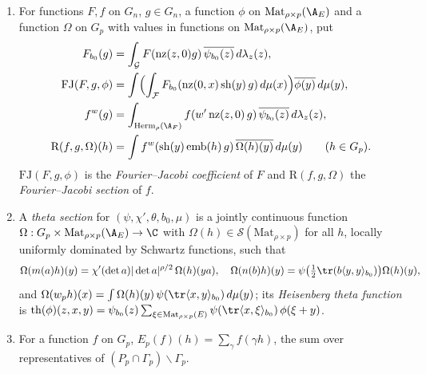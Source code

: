 \begin{definition}
\begin{enumerate}[label=(\alph*)]
$\mathrm{Herm}_\rho(E)$ and a measure $\mu$ of covolume one on $\mathrm{Mat}_{\rho\times p}(\A_E)$ with a fundamental domain $\mathcal F$.
\item For functions $F,f$ on $G_n$, $g\in G_n$, a function $\phi$ on $\mathrm{Mat}_{\rho\times p}(\A_E)$ and a function $\Omega$ on $G_p$ with values in
functions on $\mathrm{Mat}_{\rho\times p}(\A_E)$, put
\begin{align*}
F_{b_0}(g)&=\int_{\mathcal G}F(\mathrm{nz}(z,0)g)\,\overline{\psi_{b_0}(z)}\,d\lambda_z(z),\\
\mathrm{FJ}(F,g,\phi)&=\int\Bigl(\int_{\mathcal F}F_{b_0}(\mathrm{nz}(0,x)\,\mathrm{sh}(y)\,g)\,d\mu(x)\Bigr)\overline{\phi(y)}\,d\mu(y),\\
f^{w}(g)&=\int_{\mathrm{Herm}_\rho(\A_F)}f(w'\,\mathrm{nz}(z,0)\,g)\,\overline{\psi_{b_0}(z)}\,d\lambda_z(z),\\
\mathrm R(f,g,\Omega)(h)&=\int f^{w}(\mathrm{sh}(y)\,\mathrm{emb}(h)\,g)\,\overline{\Omega(h)(y)}\,d\mu(y)\qquad(h\in G_p).
\end{align*}
$\mathrm{FJ}(F,g,\phi)$ is the \emph{Fourier--Jacobi coefficient} of $F$ and $\mathrm R(f,g,\Omega)$ the \emph{Fourier--Jacobi section} of $f$.
\item A \emph{theta section} for $(\psi,\chi',\theta,b_0,\mu)$ is a jointly continuous function $\Omega:G_p\times\mathrm{Mat}_{\rho\times p}(\A_E)\to\C$
with $\Omega(h)\in\mathcal S(\mathrm{Mat}_{\rho\times p})$ for all $h$, locally uniformly dominated by Schwartz functions, such that
\[
\Omega(m(a)h)(y)=\chi'(\det a)|\det a|^{\rho/2}\,\Omega(h)(ya),\quad \Omega(n(b)h)(y)=\psi\bigl(\tfrac12\tr(b\langle y,y\rangle_{b_0})\bigr)\Omega(h)(y),
\]
and $\Omega(w_ph)(x)=\int\Omega(h)(y)\,\psi(\tr\langle x,y\rangle_{b_0})\,d\mu(y)$; its \emph{Heisenberg theta function} is
$\mathrm{th}(\phi)(z,x,y)=\psi_{b_0}(z)\sum_{\xi\in\mathrm{Mat}_{\rho\times p}(E)}\psi(\tr\langle x,\xi\rangle_{b_0})\,\phi(\xi+y)$.
\item For a function $f$ on $G_p$, $E_p(f)(h)=\sum_{\gamma}f(\gamma h)$, the sum over representatives of $(P_p\cap\Gamma_p)\backslash\Gamma_p$.
\end{enumerate}
\end{definition}

